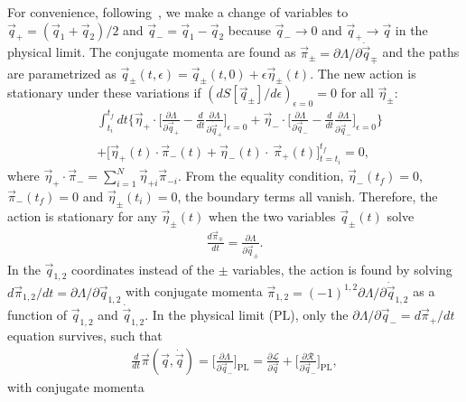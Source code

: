 For convenience, following~\cite{Galley}, we make a change of variables to $\vec{q}_+ = (\vec{q}_1 +\vec{q}_2)/2$ and $\vec{q}_- = \vec{q}_1  -\vec{q}_2$ because $\vec{q}_- \rightarrow 0$ and  $\vec{q}_+ \rightarrow \vec{q}$ in the physical limit.  The conjugate momenta are found as $\vec{\pi}_\pm = \partial \Lambda / \partial \dot{\vec{q}}_\mp$ and the paths are parametrized as $\vec{q}_{\pm} (t, \epsilon) = \vec{q}_{\pm} (t, 0) + \epsilon \vec{\eta}_{\pm}(t)$.  The new action is stationary under these variations if $(dS[\vec{q}_\pm]/d\epsilon)_{\epsilon = 0} = 0$ for all $\vec{\eta}_{\pm}$:
\begin{align}
& \int_{t_i}^{t_f} dt \Bigg\{ \vec{\eta}_+ \cdot  \Bigg[ \frac{\partial \Lambda}{\partial \vec{q}_+} - \frac{d}{dt} \frac{\partial \Lambda}{\partial \dot{\vec{q}}_+} \Bigg]_{\epsilon=0} +  \vec{\eta}_- \cdot  \Bigg[ \frac{\partial \Lambda}{\partial \vec{q}_-} - \frac{d}{dt}\frac{ \partial \Lambda}{ \partial \dot{\vec{q}}_-} \Bigg]_{\epsilon =0} \Bigg\}  \nonumber \\
&+ \Big[\vec{\eta}_+(t)\cdot  \vec{\pi}_-(t) + \vec{\eta}_-(t)\cdot \ \vec{\pi}_+(t) \Big]_{t=t_i}^{t_f} = 0,
\end{align}
where $\vec{\eta}_+\cdot \vec{\pi}_- = \sum_{i=1}^N \vec{\eta}_{+i} \vec{\pi}_{-i}$.  From the equality condition, $\vec{\eta}_- (t_f) = 0$, $\vec{\pi}_- (t_f) = 0$ and $\vec{\eta}_\pm(t_i) = 0$, the boundary terms all vanish.  Therefore, the action is stationary for any $\vec{\eta}_\pm(t)$ when the two variables $\vec{q}_\pm(t)$ solve 
\begin{align} 
\frac{d \vec{\pi}_{\mp}}{dt}  = \frac{ \partial \Lambda}{ \partial \vec{q}_\pm}.
\end{align}
In the $\vec{q}_{1,2}$ coordinates instead of the $\pm$ variables, the action is found by solving $d \vec{\pi}_{1,2}/dt  = \partial \Lambda/ \partial \vec{q}_{1,2}$ with conjugate momenta $\vec{\pi}_{1,2} = (-1)^{1,2} \partial \Lambda / \partial \dot{\vec{q}}_{1,2}$ as a function of $\vec{q}_{1,2}$ and $\dot{\vec{q}}_{1,2}$.
In the physical limit ($\mathrm{PL}$), only the $ \partial \Lambda/ \partial \vec{q}_- = d \vec{\pi}_+/dt$ equation survives, such that 
\begin{align}
\frac{d}{dt} \vec{\pi} (\vec{q},\dot{\vec{q}}) = \Bigg[ \frac{\partial \Lambda}{\partial \vec{q}_-} \Bigg]_{\mathrm{PL}} = \frac{\partial \mathcal{L}}{\partial \vec{q}} + \Bigg[ \frac{\partial \mathcal{R} }{\partial \vec{q}_-}\Bigg]_{\mathrm{PL}}, \label{eq:trajectory}
\end{align}
with conjugate momenta 
